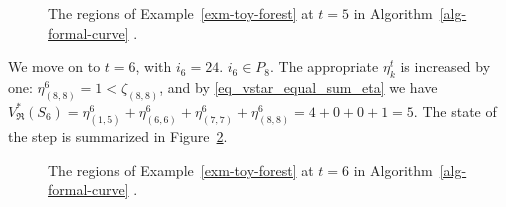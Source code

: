 \documentclass[
  11pt,
  a4paper,
]{article}
\theoremstyle{plain}
\theoremstyle{definition}
\theoremstyle{plain}
\theoremstyle{definition}
\theoremstyle{plain}
\theoremstyle{remark}
\begin{document}
\begin{figure}


\caption{\label{fig-t5}The regions of Example~\ref{exm-toy-forest} at
\(t=5\) in  Algorithm~\ref{alg-formal-curve} .}

\end{figure}%

We move on to \(t=6\), with \(i_6=24\). \(i_6\in P_8\). The appropriate
\(\eta_k^t\) is increased by one: \(\eta_{(8, 8)}^6=1<\zeta_{(8,8)}\),
and by \eqref{eq_vstar_equal_sum_eta} we have
\(V^*_{\mathfrak{R}}(S_6)=\eta_{(1, 5)}^6+\eta_{(6, 6)}^6+\eta_{(7, 7)}^6+\eta_{(8, 8)}^6=4+0+0+1=5\).
The state of the step is summarized in Figure~\ref{fig-t6}.

\begin{figure}


\caption{\label{fig-t6}The regions of Example~\ref{exm-toy-forest} at
\(t=6\) in  Algorithm~\ref{alg-formal-curve} .}

\end{figure}%
\end{document}
